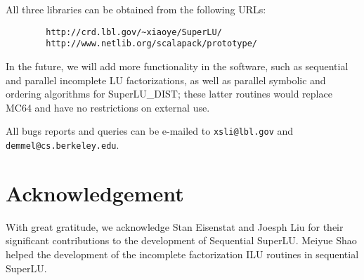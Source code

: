 All three libraries can be obtained from the following URLs:
\begin{verbatim}
        http://crd.lbl.gov/~xiaoye/SuperLU/
        http://www.netlib.org/scalapack/prototype/
\end{verbatim}


In the future, we will add more functionality in the software,
such as sequential and parallel incomplete LU factorizations,
as well as parallel symbolic and ordering algorithms for 
SuperLU\_DIST; these latter routines would replace MC64 and have
no restrictions on external use.

All bugs reports and queries can be e-mailed to
{\tt xsli@lbl.gov} and {\tt demmel@cs.berkeley.edu}.




\section{Acknowledgement}
With great gratitude, we acknowledge Stan Eisenstat and Joesph Liu for
their significant contributions to the development of Sequential SuperLU.
Meiyue Shao helped the development of the incomplete factorization ILU
routines in sequential SuperLU.

